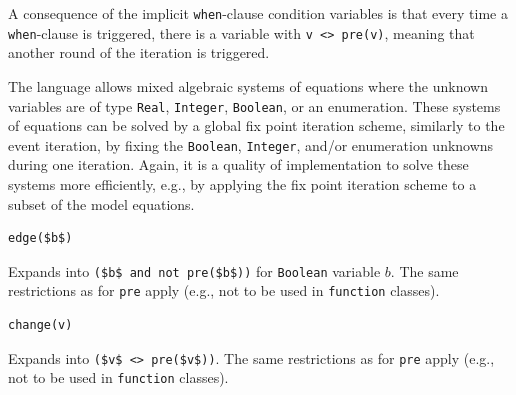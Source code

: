 \begin{operatordefinition}[pre]
\begin{semantics}
\begin{nonnormative}
A consequence of the implicit \lstinline!when!-clause condition variables is that every time a \lstinline!when!-clause is triggered, there is a variable with \lstinline!v <> pre(v)!, meaning that another round of the iteration is triggered.

The language allows mixed algebraic systems of equations where the unknown variables are of type \lstinline!Real!, \lstinline!Integer!, \lstinline!Boolean!, or an enumeration.
These systems of equations can be solved by a global fix point iteration scheme, similarly to the event iteration, by fixing the \lstinline!Boolean!, \lstinline!Integer!, and/or enumeration unknowns during one iteration.
Again, it is a quality of implementation to solve these systems more efficiently, e.g., by applying the fix point iteration scheme to a subset of the model equations.
\end{nonnormative}
\end{semantics}
\end{operatordefinition}

\begin{operatordefinition}[edge]
\begin{synopsis}\begin{lstlisting}
edge($b$)
\end{lstlisting}\end{synopsis}
\begin{semantics}
Expands into \lstinline!($b$ and not pre($b$))! for \lstinline!Boolean! variable $b$.
The same restrictions as for \lstinline!pre! apply (e.g., not to be used in \lstinline!function! classes).
\end{semantics}
\end{operatordefinition}

\begin{operatordefinition}[change]
\begin{synopsis}\begin{lstlisting}
change(v)
\end{lstlisting}\end{synopsis}
\begin{semantics}
Expands into \lstinline!($v$ <> pre($v$))!.
The same restrictions as for \lstinline!pre! apply (e.g., not to be used in \lstinline!function! classes).
\end{semantics}
\end{operatordefinition}

